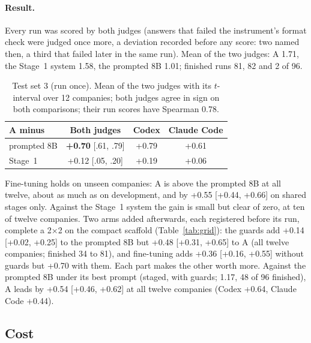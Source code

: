 \documentclass[11pt]{article}
\begin{document}
\paragraph{Result.} Every run was scored by both judges (answers that failed the instrument's format check were
judged once more, a deviation recorded before any score: two named then, a third that failed later in the same run). Mean of the two judges: A 1.71, the Stage~1 system 1.58, the prompted
8B 1.01; finished runs 81, 82 and 2 of 96.

\begin{table}[h]
\centering
\small
\setlength{\tabcolsep}{3pt}
\begin{tabular}{lccc}
\toprule
A minus & Both judges & Codex & Claude Code \\
\midrule
prompted 8B & \textbf{+0.70} [.61, .79] & +0.79 & +0.61 \\
Stage~1 & +0.12 [.05, .20] & +0.19 & +0.06 \\
\bottomrule
\end{tabular}
\caption{Test set 3 (run once). Mean of the two judges with its $t$-interval over 12 companies; both judges agree in sign on both comparisons; their run scores have Spearman 0.78.}
\label{tab:test3}
\end{table}

Fine-tuning holds on unseen companies: A is above the prompted 8B at all twelve, about as much as on development,
and by +0.55 [+0.44, +0.66] on shared stages only. Against the Stage~1 system the gain is small but
clear of zero, at ten of twelve companies. Two arms added afterwards, each registered before its run, complete
a 2$\times$2 on the compact scaffold (Table~\ref{tab:grid}): the guards add +0.14 [+0.02, +0.25] to the prompted 8B
but +0.48 [+0.31, +0.65] to A (all twelve companies; finished 34 to 81), and fine-tuning adds +0.36 [+0.16, +0.55]
without guards but +0.70 with them. Each part makes the other worth more. Against the prompted 8B under its best prompt
(staged, with guards; 1.17, 48 of 96 finished), A leads by +0.54 [+0.46, +0.62] at all twelve companies (Codex
+0.64, Claude Code +0.44).

\subsection{Cost}
\end{document}
